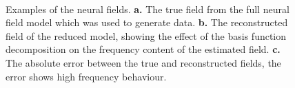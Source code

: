 \documentclass[10pt,a4paper]{article}
\begin{document}
\begin{figure}
\centering 
{}
\\
\caption{Examples of the neural fields. \textbf{a.} The true field from the full neural field model which was used to generate data. \textbf{b.} The reconstructed field of the reduced model, showing the effect of the basis function decomposition on the frequency content of the estimated field. \textbf{c.} The absolute error between the true and reconstructed fields, the error shows high frequency behaviour.}
\label{fig:FieldEstimate}
\end{figure}
\end{document}
